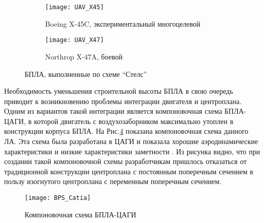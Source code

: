 \begin{figure}[ht]
        \begin{subfigure}[b]{0.47\textwidth}
                \texttt{[image: UAV\_X45]}
                \caption{Boeing X-45C, экспериментальный многоцелевой}
                \label{fig:UAV_X45}
        \end{subfigure}%
        \hspace{\fill}
        \begin{subfigure}[b]{0.47\textwidth}
                \texttt{[image: UAV\_X47]}
                \caption{Northrop X-47A, боевой} %
                \label{fig:UAV_X47}
        \end{subfigure}%
        \caption{БПЛА, выполненные по схеме ``Стелс''}\label{fig:UAVs_stealth}
\end{figure}

Необходимость уменьшения строительной высоты БПЛА в свою очередь приводит к возникновению проблемы интеграции двигателя и центроплана. Одним из вариантов такой интеграции является компоновочная схема БПЛА-ЦАГИ, в которой двигатель с воздухозаборником максимально утоплен в конструкции корпуса БПЛА.
На Рис.\ref{fig:BPS} показана компоновочная схема данного ЛА. Эта схема была разработана в ЦАГИ и показала хорошие аэродинамические характеристики и низкие характеристики заметности \cite{BPS_Report}. Из рисунка видно, что при создании такой компоновочной схемы разработчикам пришлось отказаться от традиционной конструкции центроплана с постоянным поперечным сечением в пользу изогнутого центроплана с переменным поперечным сечением.


\begin{figure}[ht]
\centering
\texttt{[image: BPS\_Catia]}
\caption{Компоновочная схема БПЛА-ЦАГИ}
\label{fig:BPS}
\end{figure}







